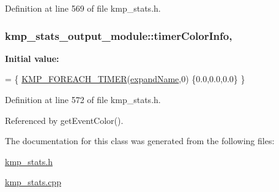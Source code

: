 Definition at line 569 of file kmp\-\_\-stats.\-h.

\hypertarget{classkmp__stats__output__module_ae48e88844238bed4a9994a095a99726d}{
\subsubsection[{timer\-Color\-Info}]{ kmp\-\_\-stats\-\_\-output\-\_\-module\-::timer\-Color\-Info\hspace{0.3cm}{\ttfamily [static]}, {\ttfamily [private]}}}\label{classkmp__stats__output__module_ae48e88844238bed4a9994a095a99726d}
{\bfseries Initial value\-:}
\begin{DoxyCode}
= \{
    \hyperlink{kmp__stats_8h_accf71030e44454acab22210bb4a89d1b}{KMP\_FOREACH\_TIMER}(\hyperlink{kmp__stats_8cpp_a17949c412e2b08e907236b2d496ed7c1}{expandName},0)
    \{0.0,0.0,0.0\}
\}
\end{DoxyCode}


Definition at line 572 of file kmp\-\_\-stats.\-h.



Referenced by get\-Event\-Color().



The documentation for this class was generated from the following files\-:\begin{DoxyCompactItemize}
\item 
\hyperlink{kmp__stats_8h}{kmp\-\_\-stats.\-h}\item 
\hyperlink{kmp__stats_8cpp}{kmp\-\_\-stats.\-cpp}\end{DoxyCompactItemize}
